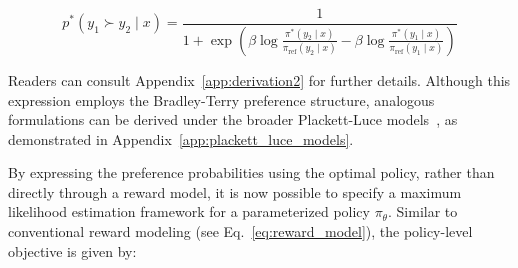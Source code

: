 \begin{equation}\label{eq:objective}
    p^*(y_1\succ y_2 \mid x)=\frac{1}{1 + \exp\left(\beta \log \frac{\pi^*(y_2\mid x)}{\pi_\text{ref}(y_2\mid x)} - \beta \log \frac{\pi^*(y_1\mid x)}{\pi_\text{ref}(y_1\mid x)}\right)}
\end{equation}

Readers can consult Appendix~\ref{app:derivation2} for further details. Although this expression employs the Bradley-Terry preference structure, analogous formulations can be derived under the broader Plackett-Luce models~\citep{plackett1975analysis, luce2012individual}, as demonstrated in Appendix~\ref{app:plackett_luce_models}.

By expressing the preference probabilities using the optimal policy, rather than directly through a reward model, it is now possible to specify a maximum likelihood estimation framework for a parameterized policy $\pi_\theta$. Similar to conventional reward modeling (see Eq.~\ref{eq:reward_model}), the policy-level objective is given by:

